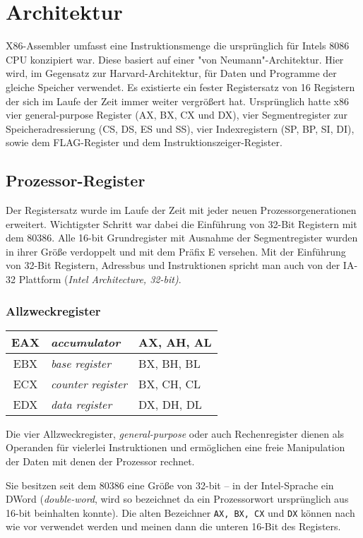\section{Architektur}
X86-Assembler umfasst eine Instruktionsmenge die ursprünglich für Intels 8086 CPU konzipiert war. Diese basiert auf einer "von Neumann"-Architektur. Hier wird, im Gegensatz zur Harvard-Architektur, für Daten und Programme der gleiche Speicher verwendet. Es existierte ein fester Registersatz von 16 Registern der sich im Laufe der Zeit immer weiter vergrößert hat. Ursprünglich hatte x86 vier general-purpose Register (AX, BX, CX und DX), vier Segmentregister zur Speicheradressierung (CS, DS, ES und SS), vier Indexregistern (SP, BP, SI, DI), sowie dem FLAG-Register und dem Instruktionszeiger-Register.

\subsection{Prozessor-Register}

Der Registersatz wurde im Laufe der Zeit mit jeder neuen Prozessorgenerationen erweitert. Wichtigster Schritt war dabei die Einführung von 32-Bit Registern mit dem 80386. Alle 16-bit Grundregister mit Ausnahme der Segmentregister wurden in ihrer Größe verdoppelt und mit dem Präfix E versehen. Mit der Einführung von 32-Bit Registern, Adressbus und Instruktionen spricht man auch von der IA-32 Plattform (\emph{Intel Architecture, 32-bit)}.

\subsubsection{Allzweckregister}

\begin{tabular}{|c|l|l|}
\hline EAX & \emph{accumulator} & AX, AH, AL \\
\hline EBX & \emph{base register} & BX, BH, BL \\
\hline ECX & \emph{counter register} & BX, CH, CL \\
\hline EDX & \emph{data register} & DX, DH, DL \\
\hline \end{tabular}

Die vier Allzweckregister, \emph{general-purpose} oder auch Rechenregister dienen als Operanden für vielerlei Instruktionen und ermöglichen eine freie Manipulation der Daten mit denen der Prozessor rechnet.

Sie besitzen seit dem 80386 eine Größe von 32-bit – in der Intel-Sprache ein DWord (\emph{double-word}, wird so bezeichnet da ein Prozessorwort ursprünglich aus 16-bit beinhalten konnte). Die alten Bezeichner {\tt AX, BX, CX} und {\tt DX} können nach wie vor verwendet werden und meinen dann die unteren 16-Bit des Registers.

